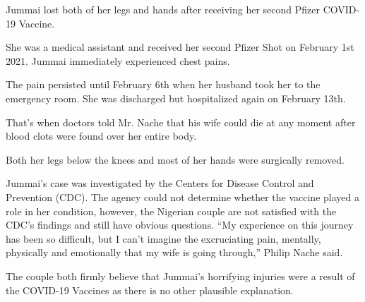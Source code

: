 Jummai lost both of her legs and hands after receiving her second Pfizer
COVID-19 Vaccine.

She was a medical assistant and received her second Pfizer Shot on February 1st
2021. Jummai immediately experienced chest pains.

The pain persisted until February 6th when her husband took her to the emergency
room. She was discharged but hospitalized again on February 13th.

That’s when doctors told Mr. Nache that his wife could die at any moment after
blood clots were found over her entire body.

Both her legs below the knees and most of her hands were surgically removed.

Jummai’s case was investigated by the Centers for Disease Control and Prevention
(CDC). The agency could not determine whether the vaccine played a role in her
condition, however, the Nigerian couple are not satisfied with the CDC’s
findings and still have obvious questions. “My experience on this journey has
been so difficult, but I can’t imagine the excruciating pain, mentally,
physically and emotionally that my wife is going through,” Philip Nache said.

The couple both firmly believe that Jummai’s horrifying injuries were a result
of the COVID-19 Vaccines as there is no other plausible explanation.

